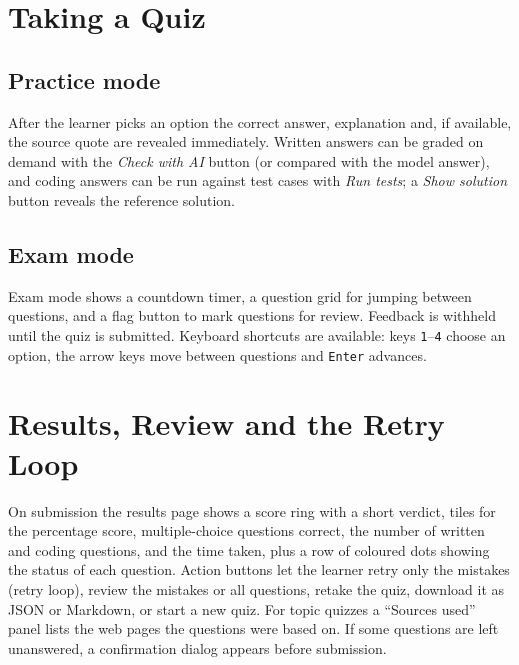 \section{Taking a Quiz}
\subsection{Practice mode}
After the learner picks an option the correct answer, explanation and, if available, the source quote are revealed immediately. Written answers can be graded on demand with the \textit{Check with AI} button (or compared with the model answer), and coding answers can be run against test cases with \textit{Run tests}; a \textit{Show solution} button reveals the reference solution.

\subsection{Exam mode}
Exam mode shows a countdown timer, a question grid for jumping between questions, and a flag button to mark questions for review. Feedback is withheld until the quiz is submitted. Keyboard shortcuts are available: keys \texttt{1}--\texttt{4} choose an option, the arrow keys move between questions and \texttt{Enter} advances.


\section{Results, Review and the Retry Loop}
On submission the results page shows a score ring with a short verdict, tiles for the percentage score, multiple-choice questions correct, the number of written and coding questions, and the time taken, plus a row of coloured dots showing the status of each question. Action buttons let the learner retry only the mistakes (retry loop), review the mistakes or all questions, retake the quiz, download it as JSON or Markdown, or start a new quiz. For topic quizzes a ``Sources used'' panel lists the web pages the questions were based on. If some questions are left unanswered, a confirmation dialog appears before submission.

